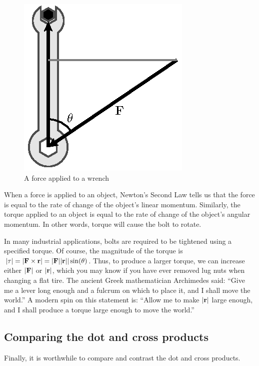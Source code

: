 \begin{figure}
  \begin{center}
    \includegraphics{figures/fig_9_4_wrench.eps}
    \caption{A force applied to a wrench}
    \label{F:9.4.wrench}
  \end{center}
\end{figure}

When a force is applied to an object, Newton's Second Law tells us
that the force is equal to the rate of change of the object's linear
momentum.  Similarly, the torque applied to an object is equal to the
rate of change of the object's angular momentum.  In other words,
torque will cause the bolt to rotate.

In many industrial applications, bolts are required to be tightened
using a specified torque.  Of course, the magnitude of the torque is
$|\tau| =|\mathbf{F}\times\mathbf{r}|=|\mathbf{F}||\mathbf{r}||\sin(\theta)$.  Thus, to produce a
larger torque, we can increase either $|\mathbf{F}|$ or $|\mathbf{r}|$, which you
may know if you have ever removed lug nuts when changing a flat tire.
The ancient Greek mathematician Archimedes said: ``Give me a lever
long enough and a fulcrum on which to place it, and I shall move the
world.''  A modern spin on this statement is: ``Allow me to make
$|\mathbf{r}|$ large enough, and I shall produce a torque large enough to
move the world.''

\subsection*{Comparing the dot and cross products}

Finally, it is worthwhile to compare and contrast the dot and cross
products.

